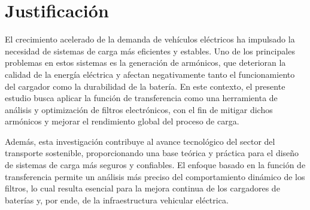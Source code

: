 \section{Justificaci\'on}
\label{sec:justificacion}

El crecimiento acelerado de la demanda de veh\'iculos el\'ectricos ha impulsado la necesidad de sistemas de carga m\'as eficientes y estables. Uno de los principales problemas en estos sistemas es la generaci\'on de arm\'onicos, que deterioran la calidad de la energ\'ia el\'ectrica y afectan negativamente tanto el funcionamiento del cargador como la durabilidad de la bater\'ia. En este contexto, el presente estudio busca aplicar la funci\'on de transferencia como una herramienta de an\'alisis y optimizaci\'on de filtros electr\'onicos, con el fin de mitigar dichos arm\'onicos y mejorar el rendimiento global del proceso de carga.

Adem\'as, esta investigaci\'on contribuye al avance tecnol\'ogico del sector del transporte sostenible, proporcionando una base te\'orica y pr\'actica para el dise\~no de sistemas de carga m\'as seguros y confiables. El enfoque basado en la funci\'on de transferencia permite un an\'alisis m\'as preciso del comportamiento din\'amico de los filtros, lo cual resulta esencial para la mejora continua de los cargadores de bater\'ias y, por ende, de la infraestructura vehicular el\'ectrica.

